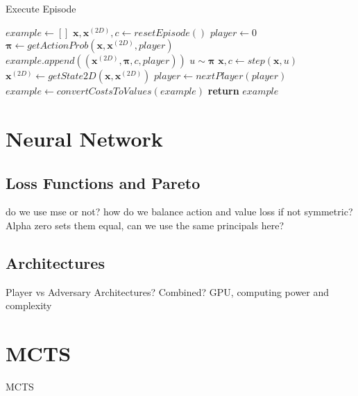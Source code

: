 \documentclass[../main.tex]{subfiles}
\begin{document}
\begin{algorithm}
   \caption{Execute Episode}
   \label{alg:executeEpisode}
   \begin{algorithmic}[1]
      \State $example \leftarrow []$
      \State $\boldsymbol{x}, \boldsymbol{x}^{(2D)}, c \leftarrow resetEpisode()$
      \State $player\leftarrow 0$
      \Repeat
         \State $\boldsymbol{\pi} \leftarrow getActionProb(\boldsymbol{x}, \boldsymbol{x}^{(2D)}, player)$
         \State $example.append((\boldsymbol{x}^{(2D)}, \boldsymbol{\pi}, c, player))$
         \State $u \sim \boldsymbol{\pi}$
         \State $\boldsymbol{x}, c \leftarrow step(\boldsymbol{x}, u)$
         \State $\boldsymbol{x}^{(2D)} \leftarrow getState2D(\boldsymbol{x}, \boldsymbol{x}^{(2D)})$
         \State $player \leftarrow nextPlayer(player)$
      \State $example \leftarrow convertCostsToValues(example)$
      \State \textbf{return} $example$
      \EndFunction
   \end{algorithmic}
\end{algorithm}

\section{Neural Network}
\subsection{Loss Functions and Pareto}
do we use mse or not? how do we balance action and value loss if not symmetric? Alpha zero sets them equal, can we use the same principals here?

\subsection{Architectures}
Player vs Adversary Architectures? Combined? GPU, computing power and complexity

\section{MCTS}

\begin{algorithm}
   \caption{MCTS}
   \label{alg:mcts}
   \begin{algorithmic}[1]
      \EndFunction
      \Statex

      
      \EndFunction
   \end{algorithmic}
\end{algorithm}
\end{document}
